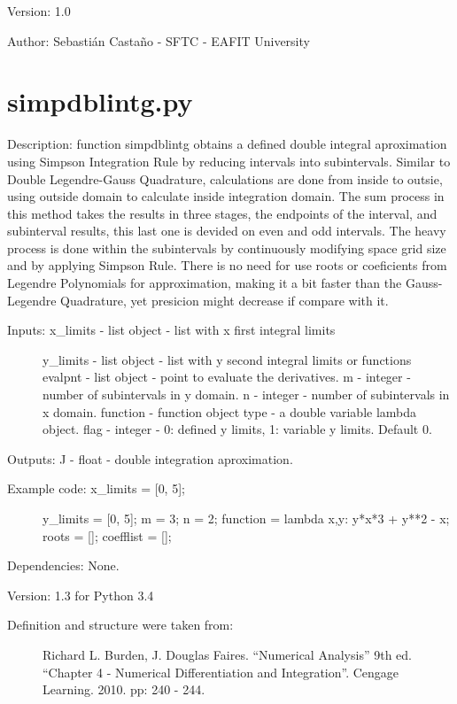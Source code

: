\documentclass[letterpaper,10pt,oneside]{sphinxmanual}
\theoremstyle{plain}%
\theoremstyle{definition}%
\theoremstyle{remark}%
\begin{document}
Version: 1.0

Author: Sebastián Castaño - SFTC - EAFIT University


\section{simpdblintg.py}
\label{code:module-simpdblintg}\label{code:simpdblintg-py}
Description: function simpdblintg obtains a defined double integral 
aproximation using Simpson Integration Rule by reducing intervals into
subintervals. Similar to Double Legendre-Gauss Quadrature, calculations are
done from inside to outsie, using outside domain to calculate inside 
integration domain. The sum process in this method takes the results in 
three stages, the endpoints of the interval, and subinterval results, this
last one is devided on even and odd intervals. The heavy process is done
within the subintervals by continuously modifying space grid size and by
applying Simpson Rule. There is no need for use roots or coeficients from
Legendre Polynomials for approximation, making it a bit faster than the
Gauss-Legendre Quadrature, yet presicion might decrease if compare with it.
\begin{description}
\item[{Inputs: x\_limits - list object - list with x first integral limits}] \leavevmode
y\_limits - list object - list with y second integral limits or functions
evalpnt - list object - point to evaluate the derivatives.
m - integer - number of subintervals in y domain.
n - integer - number of subintervals in x domain.
function - function object type - a double variable lambda object.
flag - integer - 0: defined y limits, 1: variable y limits. Default 0.

\end{description}

Outputs: J - float - double integration aproximation.
\begin{description}
\item[{Example code: x\_limits = {[}0, 5{]};}] \leavevmode
y\_limits = {[}0, 5{]};
m = 3;
n = 2;
function = lambda x,y: y*x*3 + y**2 - x;
roots = {[}{]};
coefflist = {[}{]};

\end{description}

Dependencies: None.

Version: 1.3 for Python 3.4
\begin{description}
\item[{Definition and structure were taken from:}] \leavevmode
Richard L. Burden, J. Douglas Faires. ``Numerical Analysis'' 9th ed.
``Chapter 4 - Numerical Differentiation and Integration''. 
Cengage Learning. 2010. pp: 240 - 244.

\end{description}
\end{document}
